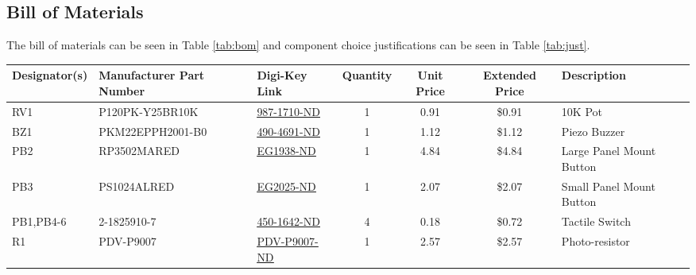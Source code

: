 \documentclass{article}
\begin{document}
\begin{landscape}
\thispagestyle{empty}

\section{Bill of Materials} %
The bill of materials can be seen in Table \ref{tab:bom} and component choice justifications can be seen in Table \ref{tab:just}.
\begin{table}[h!]
    \centering
    \begin{tabular}{l|l|l|c|c|c|l}
    \textbf{Designator(s)}&\textbf{Manufacturer Part   Number} & \textbf{Digi-Key Link} & \textbf{Quantity} & \textbf{Unit Price} & \textbf{Extended Price} & \textbf{Description}      \\
    \hline
RV1&P120PK-Y25BR10K                  & \href{https://www.digikey.ca/en/products/detail/tt-electronics-bi/P120PK-Y25BR10K/5957454}{\underline{987-1710-ND}}               & 1                 & 0.91                & \$0.91                  & 10K Pot                   \\
BZ1&PKM22EPPH2001-B0                 & \href{https://www.digikey.ca/en/products/detail/murata-electronics/PKM22EPPH2001-B0/1219322}{\underline{490-4691-ND}}             & 1                 & 1.12                & \$1.12                  & Piezo Buzzer              \\
PB2&RP3502MARED                      & \href{https://www.digikey.ca/en/products/detail/e-switch/RP3502MARED/280456}{\underline{EG1938-ND}}                               & 1                 & 4.84                & \$4.84                  & Large Panel Mount Button  \\
PB3&PS1024ALRED                      & \href{https://www.digikey.ca/en/products/detail/e-switch/PS1024ALRED/81539}{\underline{EG2025-ND}}                                & 1                 & 2.07                & \$2.07                  & Small Panel Mount Button  \\
PB1,PB4-6&2-1825910-7                & \href{https://www.digikey.ca/en/products/detail/te-connectivity-alcoswitch-switches/2-1825910-7/1632528}{\underline{450-1642-ND}} & 4                 & 0.18                & \$0.72                  & Tactile Switch            \\
R1&PDV-P9007                         & \href{https://www.digikey.ca/en/products/detail/advanced-photonix/PDV-P9007/480624}{\underline{PDV-P9007-ND}}                     & 1                 & 2.57                & \$2.57                  & Photo-resistor             \\

\end{tabular}
\end{table}
\end{landscape}
\end{document}
